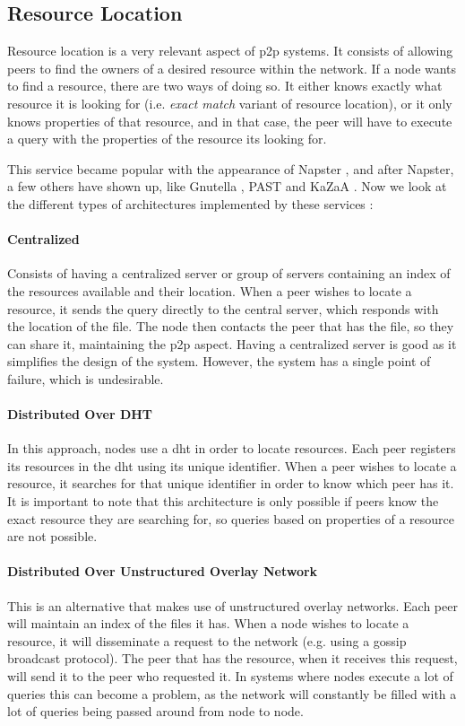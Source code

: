 \subsection{Resource Location}
\label{ssec:resource_location}
\par Resource location is a very relevant aspect of \gls{p2p} systems. It consists of allowing peers to find the owners of a desired resource within the network. If a node wants to find a resource, there are two ways of doing so. It either knows exactly what resource it is looking for (i.e. \textit{exact match} variant of resource location), or it only knows properties of that resource, and in that case, the peer will have to execute a query with the properties of the resource its looking for.
\par This service became popular with the appearance of Napster \cite{Napster}, and after Napster, a few others have shown up, like Gnutella \cite{Bordignon2001}, PAST \cite{Druschel2001} and KaZaA \cite{Good2003}. %
Now we look at the different types of architectures implemented by these services \cite{Leitao2010}:
\paragraph{Centralized} Consists of having a centralized server or group of servers containing an index of the resources available and their location. When a peer wishes to locate a resource, it sends the query directly to the central server, which responds with the location of the file. The node then contacts the peer that has the file, so they can share it, maintaining the \gls{p2p} aspect. Having a centralized server is good as it simplifies the design of the system. However, the system has a single point of failure, which is undesirable.
\paragraph{Distributed Over DHT} In this approach, nodes use a \gls{dht} in order to locate resources. Each peer registers its resources in the \gls{dht} using its unique identifier. When a peer wishes to locate a resource, it searches for that unique identifier in order to know which peer has it. It is important to note that this architecture is only possible if peers know the exact resource they are searching for, so queries based on properties of a resource are not possible.
\paragraph{Distributed Over Unstructured Overlay Network} This is an alternative that makes use of unstructured overlay networks. Each peer will maintain an index of the files it has. When a node wishes to locate a resource, it will disseminate a request to the network (e.g. using a gossip broadcast protocol). The peer that has the resource, when it receives this request, will send it to the peer who requested it. In systems where nodes execute a lot of queries this can become a problem, as the network will constantly be filled with a lot of queries being passed around from node to node.
